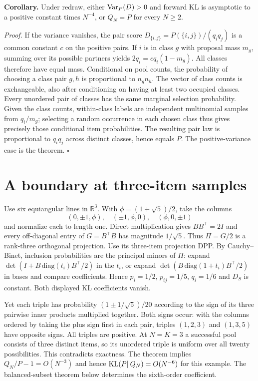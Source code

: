 \documentclass[11pt]{article}
\begin{document}
\textbf{Corollary.} Under redraw, either $\operatorname{Var}_P(D)>0$ and forward KL is asymptotic to a positive constant times $N^{-4}$, or $Q_N=P$ for every $N\ge2$.

\textit{Proof.} If the variance vanishes, the pair score $D_{\{i,j\}}=P(\{i,j\})/(q_iq_j)$ is a common constant $c$ on the positive pairs. If $i$ is in class $g$ with proposal mass $m_g$, summing over its possible partners yields $2q_i=cq_i(1-m_g)$. All classes therefore have equal mass. Conditional on pool counts, the probability of choosing a class pair $g,h$ is proportional to $n_g n_h$. The vector of class counts is exchangeable, also after conditioning on having at least two occupied classes. Every unordered pair of classes has the same marginal selection probability. Given the class counts, within-class labels are independent multinomial samples from $q_i/m_g$; selecting a random occurrence in each chosen class thus gives precisely those conditional item probabilities. The resulting pair law is proportional to $q_iq_j$ across distinct classes, hence equals $P$. The positive-variance case is the theorem. \hfill$\square$

\section{A boundary at three-item samples}
Use six equiangular lines in $\mathbb R^3$. With $\phi=(1+\sqrt5)/2$, take the columns
\[
 (0,\pm1,\phi),\quad (\pm1,\phi,0),\quad(\phi,0,\pm1)
\]
and normalize each to length one. Direct multiplication gives $BB^\top=2I$ and every off-diagonal entry of $G=B^\top B$ has magnitude $1/\sqrt5$. Thus $\Pi=G/2$ is a rank-three orthogonal projection. Use its three-item projection DPP. By Cauchy--Binet, inclusion probabilities are the principal minors of $\Pi$: expand $\det(I+B\,\mathrm{diag}(t_i)B^\top/2)$ in the $t_i$, or expand $\det(B\,\mathrm{diag}(1+t_i)B^\top/2)$ in bases and compare coefficients. Hence $p_i=1/2$, $p_{ij}=1/5$, $q_i=1/6$ and $D_S$ is constant. Both displayed KL coefficients vanish.

Yet each triple has probability $(1\pm1/\sqrt5)/20$ according to the sign of its three pairwise inner products multiplied together. Both signs occur: with the columns ordered by taking the plus sign first in each pair, triples $(1,2,3)$ and $(1,3,5)$ have opposite signs. All triples are positive. At $N=K=3$ a successful pool consists of three distinct items, so its unordered triple is uniform over all twenty possibilities. This contradicts exactness. The theorem implies $Q_N/P-1=O(N^{-3})$ and hence $\operatorname{KL}(P\|Q_N)=O(N^{-6})$ for this example. The balanced-subset theorem below determines the sixth-order coefficient.
\end{document}
